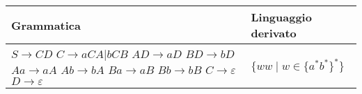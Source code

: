 \documentclass{standalone}
\begin{document}
\begin{tabularx}{\textwidth}{XX}
		Grammatica & Linguaggio derivato \\
    \midrule
        $S \to CD $ \newline
        $C \to aCA | bCB $ \newline
        $AD \to aD $ \newline
        $BD \to bD $ \newline
        $Aa \to aA $ \newline
        $Ab \to bA $ \newline
        $Ba \to aB $ \newline
        $Bb \to bB $ \newline
        $C \to \varepsilon $ \newline
        $D \to \varepsilon $
        & 
        $\{ ww \mid w \in \{a^*b^*\}^*\}$
\end{tabularx}
\end{document}
